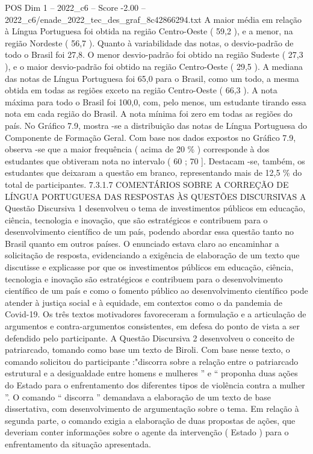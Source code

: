 \begin{textsample}{POS Dim 1 – 2022\_c6 – Score -2.00 – 2022\_c6/enade\_2022\_tec\_des\_graf\_8c42866294.txt}
A maior média em relação à Língua Portuguesa foi obtida na região Centro-Oeste ( 59,2 ), e a menor, na região Nordeste ( 56,7 ).
Quanto à variabilidade das notas, o desvio-padrão de todo o Brasil foi 27,8.
O menor desvio-padrão foi obtido na região Sudeste ( 27,3 ), e o maior desvio-padrão foi obtido na região Centro-Oeste ( 29,5 ).
A mediana das notas de Língua Portuguesa foi 65,0 para o Brasil, como um todo, a mesma obtida em todas as regiões exceto na região Centro-Oeste ( 66,3 ).
A nota máxima para todo o Brasil foi 100,0, com, pelo menos, um estudante tirando essa nota em cada região do Brasil.
A nota mínima foi zero em todas as regiões do país.
No Gráfico 7.9, mostra -se a distribuição das notas de Língua Portuguesa do Componente de Formação Geral.
Com base nos dados expostos no Gráfico 7.9, observa -se que a maior frequência ( acima de 20 \% ) corresponde à dos estudantes que obtiveram nota no intervalo ( 60 ; 70 ].
Destacam -se, também, os estudantes que deixaram a questão em branco, representando mais de 12,5 \% do total de participantes. 7.3.1.7 COMENTÁRIOS SOBRE A CORREÇÃO DE LÍNGUA PORTUGUESA DAS RESPOSTAS ÀS QUESTÕES DISCURSIVAS A Questão Discursiva 1 desenvolveu o tema de investimentos públicos em educação, ciência, tecnologia e inovação, que são estratégicos e contribuem para o desenvolvimento científico de um país, podendo abordar essa questão tanto no Brasil quanto em outros países.
O enunciado estava claro ao encaminhar a solicitação de resposta, evidenciando a exigência de elaboração de um texto que discutisse e explicasse por que os investimentos públicos em educação, ciência, tecnologia e inovação são estratégicos e contribuem para o desenvolvimento científico de um país e como o fomento público ao desenvolvimento científico pode atender à justiça social e à equidade, em contextos como o da pandemia de Covid-19.
Os três textos motivadores favoreceram a formulação e a articulação de argumentos e contra-argumentos consistentes, em defesa do ponto de vista a ser defendido pelo participante.
A Questão Discursiva 2 desenvolveu o conceito de patriarcado, tomando como base um texto de Biroli.
Com base nesse texto, o comando solicitou do participante :"discorra sobre a relação entre o patriarcado estrutural e a desigualdade entre homens e mulheres ” e “ proponha duas ações do Estado para o enfrentamento dos diferentes tipos de violência contra a mulher ”.
O comando “ discorra ” demandava a elaboração de um texto de base dissertativa, com desenvolvimento de argumentação sobre o tema.
Em relação à segunda parte, o comando exigia a elaboração de duas propostas de ações, que deveriam conter informações sobre o agente da intervenção ( Estado ) para o enfrentamento da situação apresentada.

\end{textsample}
